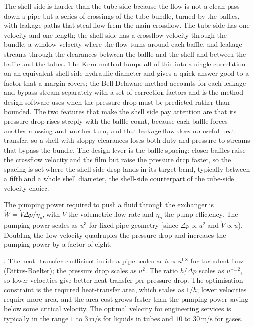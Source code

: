 The shell side is harder than the tube side because the flow is not a clean pass
down a pipe but a series of crossings of the tube bundle, turned by the baffles,
with leakage paths that steal flow from the main crossflow. The tube side has one
velocity and one length; the shell side has a crossflow velocity through the bundle,
a window velocity where the flow turns around each baffle, and leakage streams
through the clearances between the baffle and the shell and between the baffle and
the tubes. The Kern method lumps all of this into a single correlation on an
equivalent shell-side hydraulic diameter and gives a quick answer good to a factor
that a margin covers; the Bell-Delaware method accounts for each leakage and bypass
stream separately with a set of correction factors and is the method design software
uses when the pressure drop must be predicted rather than bounded. The two features
that make the shell side pay attention are that its pressure drop rises steeply with
the baffle count, because each baffle forces another crossing and another turn, and
that leakage flow does no useful heat transfer, so a shell with sloppy clearances
loses both duty and pressure to streams that bypass the bundle. The design lever is
the baffle spacing: closer baffles raise the crossflow velocity and the film but
raise the pressure drop faster, so the spacing is set where the shell-side drop
lands in its target band, typically between a fifth and a whole shell diameter, the
shell-side counterpart of the tube-side velocity choice.

The pumping power required to push a fluid through the exchanger is
$\dot{W} = \dot{V} \Delta p / \eta_p$, with $\dot{V}$ the volumetric
flow rate and $\eta_p$ the pump efficiency. The pumping power scales
as $u^3$ for fixed pipe geometry (since $\Delta p \propto u^2$ and
$\dot{V} \propto u$). Doubling the flow velocity quadruples the
pressure drop and increases the pumping power by a factor of eight.

. The heat-
transfer coefficient inside a pipe scales as $h \propto u^{0.8}$ for
turbulent flow (Dittus-Boelter); the pressure drop scales as $u^{2}$.
The ratio $h/\Delta p$ scales as $u^{-1.2}$, so lower velocities
give better heat-transfer-per-pressure-drop. The optimisation
constraint is the required heat-transfer area, which scales as
$1/h$; lower velocities require more area, and the area cost grows
faster than the pumping-power saving below some critical velocity.
The optimal velocity for engineering services is typically in the
range $1$ to $3\,\text{m/s}$ for liquids in tubes and $10$ to $30\,
\text{m/s}$ for gases.

